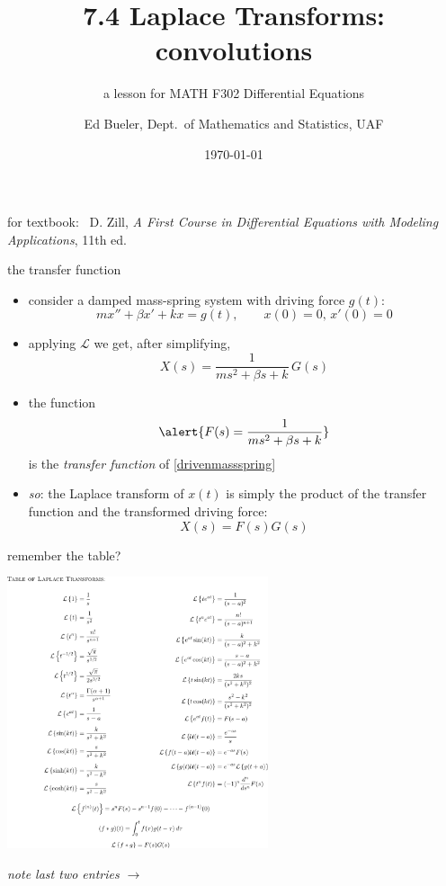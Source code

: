 \documentclass[urlcolor=blue,dvipsnames]{beamer}
\title{7.4 Laplace Transforms: \\ convolutions}
\subtitle{a lesson for MATH F302 Differential Equations}
\author{Ed Bueler, Dept.~of Mathematics and Statistics, UAF}
\date{\tiny \today}
\begin{document}
\renewcommand{\thefootnote}{{\color{green} \arabic{footnote}}}

\begin{frame}
\titlepage

\centerline{\tiny for textbook: \, D. Zill, \emph{A First Course in Differential Equations with Modeling Applications}, 11th ed.}
\end{frame}

\newcommand{\LL}[1]{\mathcal{L}\left\{#1\right\}}
\newcommand{\LLi}[1]{\mathcal{L}^{-1}\left\{#1\right\}}


\begin{frame}{the transfer function}

\begin{itemize}
\item consider a damped mass-spring system with driving force $g(t)$:
\begin{equation}
m x'' + \beta x' + k x = g(t), \qquad x(0)=0, \, x'(0)=0  \tag{$\ast$} \label{drivenmassspring}
\end{equation}
\item applying $\mathcal{L}$ we get, after simplifying,
    $$X(s) = \frac{1}{ms^2+\beta s+k}\,G(s)$$
\item the function
    $$\alert{F(s) = \frac{1}{ms^2+\beta s+k}}$$
is the \alert{\emph{transfer function}} of \eqref{drivenmassspring}
\item \emph{so}: the Laplace transform of $x(t)$ is simply the product of the transfer function and the transformed driving force:
    $$X(s) = F(s) G(s)$$
\end{itemize}
\end{frame}


\begin{frame}{remember the table?}

\vspace{-5mm}
\begin{center}
\includegraphics[height=80mm]{figs/fulllaplacetable}
\end{center}

\vspace{-13mm}
\alert{\emph{note last two entries $\to$}}
\end{frame}
\end{document}
